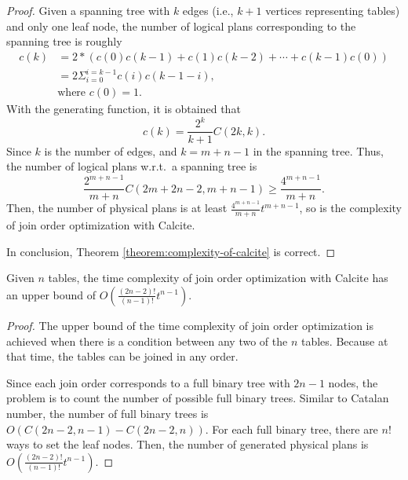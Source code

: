 \begin{proof}
    Given a spanning tree with $k$ edges (i.e., $k+1$ vertices representing tables) and only one leaf node, the number of logical plans corresponding to the spanning tree is roughly
    \begin{equation*}
        \begin{split}
            c(k) & = 2 * (c(0)c(k-1) + c(1)c(k-2) + \cdots + c(k-1)c(0)) \\
            & = 2\Sigma_{i=0}^{i=k-1}c(i)c(k-1-i), \\
            & \text{where } c(0) = 1.
        \end{split}
    \end{equation*}
    With the generating function, it is obtained that 
    \begin{equation*}
        c(k) = \frac{2^k}{k+1}C(2k, k).
    \end{equation*}
    Since $k$ is the number of edges, and $k = m + n - 1$ in the spanning tree.
    Thus, the number of logical plans w.r.t.~a spanning tree is 
    \begin{equation*}
        \frac{2^{m+n-1}}{m+n}C(2m+2n-2, m+n-1) \geq \frac{4^{m+n-1}}{m+n}.
    \end{equation*}
   Then, the number of physical plans is at least $\frac{4^{m+n-1}}{m+n}t^{m+n-1}$, so is the complexity of join order optimization with Calcite.
   
   In conclusion, Theorem \ref{theorem:complexity-of-calcite} is correct.
\end{proof}

\begin{lemma}
    \label{lemma:upper-bound-of-calcite}
    Given $n$ tables, the time complexity of join order optimization with Calcite has an upper bound of $O(\frac{(2n-2)!}{(n-1)!}t^{n-1})$.
\end{lemma}
\begin{proof}
    The upper bound of the time complexity of join order optimization is achieved when there is a condition between any two of the $n$ tables.
    Because at that time, the tables can be joined in any order.

    Since each join order corresponds to a full binary tree with $2n-1$ nodes, the problem is to count the number of possible full binary trees.
    Similar to Catalan number, the number of full binary trees is $O(C(2n-2, n-1) - C(2n-2, n))$.
    For each full binary tree, there are $n!$ ways to set the leaf nodes. 
    Then, the number of generated physical plans is $O(\frac{(2n-2)!}{(n-1)!}t^{n-1})$.
\end{proof}

